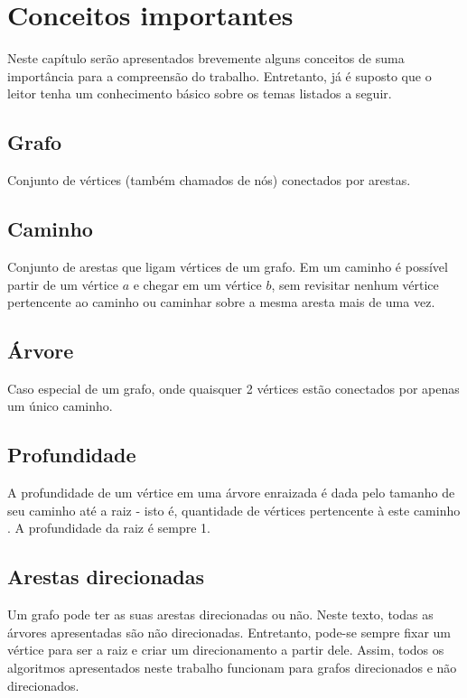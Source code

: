\chapter{Conceitos importantes}
\label{cap:conceitos-importantes}

Neste capítulo serão apresentados brevemente alguns conceitos de suma importância 
para a compreensão do trabalho. Entretanto, já é suposto que o leitor tenha um 
conhecimento básico sobre os temas listados a seguir.

\section{Grafo}

Conjunto de vértices (também chamados de nós) conectados por arestas. \cite{cormen}

\section{Caminho}

Conjunto de arestas que ligam vértices de um grafo. Em um caminho é possível 
partir de um vértice $a$ e chegar em um vértice $b$, sem revisitar nenhum 
vértice pertencente ao caminho ou caminhar sobre a mesma aresta mais de uma vez.

\section{Árvore}

Caso especial de um grafo, onde quaisquer 2 vértices estão conectados por apenas 
um único caminho.

\section{Profundidade} 

A profundidade de um vértice em uma árvore enraizada é dada pelo tamanho de seu caminho
até a raiz - isto é, quantidade de vértices pertencente à este caminho . A profundidade da raiz é sempre 1.

\section{Arestas direcionadas}

Um grafo pode ter as suas arestas direcionadas ou não. Neste texto, todas as árvores apresentadas são não direcionadas. Entretanto, pode-se sempre fixar um vértice para ser a raiz e criar um direcionamento a partir dele. Assim, todos os algoritmos apresentados neste trabalho funcionam para grafos direcionados e não direcionados.

